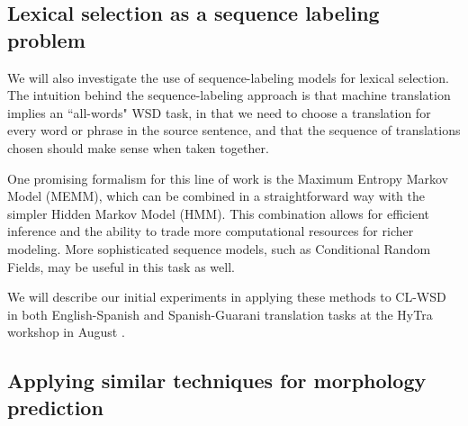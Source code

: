 \subsection{Lexical selection as a sequence labeling problem}
We will also investigate the use of sequence-labeling models for
lexical selection.  The intuition behind the sequence-labeling approach is that
machine translation implies an ``all-words" WSD task, in that we need to choose
a translation for every word or phrase in the source sentence, and that the
sequence of translations chosen should make sense when taken together.

One promising formalism for this line of work is the Maximum
Entropy Markov Model (MEMM), which can be combined in a straightforward way
with the simpler Hidden Markov Model (HMM). This combination allows for
efficient inference and the ability to trade more computational resources for
richer modeling. More sophisticated sequence models, such as Conditional Random
Fields, may be useful in this task as well.

We will describe our initial experiments in applying these methods to CL-WSD in
both English-Spanish and Spanish-Guarani translation tasks at the HyTra
workshop in August \cite{rudnick-gasser:2013:HyTra-2013}.

\subsection{Applying similar techniques for morphology prediction}
